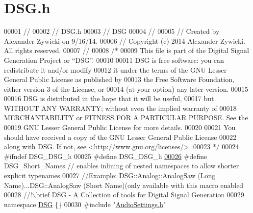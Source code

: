 \hypertarget{_d_s_g_8h_source}{\section{D\+S\+G.\+h}
\label{_d_s_g_8h_source}
}

\begin{DoxyCode}
00001 \textcolor{comment}{//}
00002 \textcolor{comment}{//  DSG.h}
00003 \textcolor{comment}{//  DSG}
00004 \textcolor{comment}{//}
00005 \textcolor{comment}{//  Created by Alexander Zywicki on 9/16/14.}
00006 \textcolor{comment}{//  Copyright (c) 2014 Alexander Zywicki. All rights reserved.}
00007 \textcolor{comment}{//}
00008 \textcolor{comment}{/*}
00009 \textcolor{comment}{ This file is part of the Digital Signal Generation Project or “DSG”.}
00010 \textcolor{comment}{}
00011 \textcolor{comment}{ DSG is free software: you can redistribute it and/or modify}
00012 \textcolor{comment}{ it under the terms of the GNU Lesser General Public License as published by}
00013 \textcolor{comment}{ the Free Software Foundation, either version 3 of the License, or}
00014 \textcolor{comment}{ (at your option) any later version.}
00015 \textcolor{comment}{}
00016 \textcolor{comment}{ DSG is distributed in the hope that it will be useful,}
00017 \textcolor{comment}{ but WITHOUT ANY WARRANTY; without even the implied warranty of}
00018 \textcolor{comment}{ MERCHANTABILITY or FITNESS FOR A PARTICULAR PURPOSE.  See the}
00019 \textcolor{comment}{ GNU Lesser General Public License for more details.}
00020 \textcolor{comment}{}
00021 \textcolor{comment}{ You should have received a copy of the GNU Lesser General Public License}
00022 \textcolor{comment}{ along with DSG.  If not, see <http://www.gnu.org/licenses/>.}
00023 \textcolor{comment}{ */}
00024 \textcolor{preprocessor}{#ifndef DSG\_DSG\_h}
00025 \textcolor{preprocessor}{#define DSG\_DSG\_h}
\hypertarget{_d_s_g_8h_source_l00026}{}\hyperlink{_d_s_g_8h_a83f0da18914977ca7a09b93cb1f57a05}{00026} \textcolor{preprocessor}{#define DSG\_Short\_Names // enables inlining of nested namespaces to allow shorter explicit typenames}
00027 \textcolor{comment}{//Example: DSG::Analog::AnalogSaw (Long Name)...DSG::AnalogSaw (Short Name)(only available with this macro
       enabled}\textcolor{comment}{}
00028 \textcolor{comment}{//!\(\backslash\)brief DSG - A Collection of tools for Digital Signal Generation}
00029 \textcolor{comment}{}\textcolor{keyword}{namespace }\hyperlink{namespace_d_s_g}{DSG} \{\}
00030 \textcolor{preprocessor}{#include "\hyperlink{_audio_settings_8h}{AudioSettings.h}"}

\end{DoxyCode}
